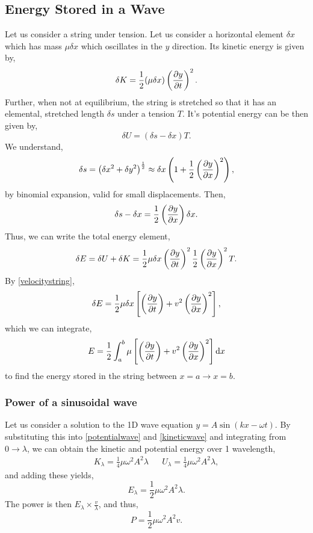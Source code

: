 \documentclass{book}
\begin{document}
\subsection{Energy Stored in a Wave}
Let us consider a string under tension. Let us consider a horizontal element $\delta x$ which has mass $\mu\delta x$ which oscillates in the $y$ direction. Its kinetic energy is given by,
\begin{equation}
    \delta K = \frac{1}{2}(\mu\delta x)\left(\pdv{y}{t}\right)^2. \label{kineticwave}
\end{equation}
Further, when not at equilibrium, the string is stretched so that it has an elemental, stretched length $\delta s$ under a tension $T$. It's potential energy can be then given by,
\begin{equation}
    \delta U = (\delta s - \delta x)T. \label{potentialwave}
\end{equation}
We understand,
\begin{equation}
    \delta s = \left(\delta x^2 + \delta y^2\right)^{\frac{1}{2}}\approx \delta x\left(1 + \frac{1}{2}\left(\pdv{y}{x}\right)^2\right),
\end{equation}
by binomial expansion, valid for small displacements. Then,
\begin{equation}
    \delta s - \delta x = \frac{1}{2}\left(\pdv{y}{x}\right)\delta x. 
\end{equation}
Thus, we can write the total energy element,
\begin{equation}
    \delta E = \delta U + \delta K = \frac{1}{2}\mu \delta x\left(\pdv{y}{t}\right)^2 \frac{1}{2}\left(\pdv{y}{x}\right)^2T.
\end{equation}
By \eqref{velocitystring},
\begin{equation}
    \delta E = \frac{1}{2}\mu\delta x\left[\left(\pdv{y}{t}\right)+ v^2\left(\pdv{y}{x}\right)^2\right],
\end{equation}
which we can integrate,
\begin{equation}
    E = \frac{1}{2}\int_a^b \mu\left[\left(\pdv{y}{t}\right)+ v^2\left(\pdv{y}{x}\right)^2\right]\dd{x}
\end{equation}
to find the energy stored in the string between $x=a \to x=b$.
\subsubsection{Power of a sinusoidal wave}
Let us consider a solution to the 1D wave equation $y = A\sin(kx -\omega t)$. By substituting this into \eqref{potentialwave} and \eqref{kineticwave} and integrating from $0 \to \lambda$, we can obtain the kinetic and potential energy over 1 wavelength,
\begin{align}
    K_{\lambda} = \frac{1}{4}\mu\omega^2A^2\lambda && U_{\lambda} = \frac{1}{4}\mu\omega^2A^2\lambda,
\end{align}
and adding these yields,
\begin{equation}
    E_{\lambda} = \frac{1}{2}\mu\omega^2A^2\lambda.
\end{equation}
The power is then $E_{\lambda}\times\frac{v}{\lambda}$, and thus,
\begin{equation}
    P = \frac{1}{2}\mu\omega^2A^2v.
\end{equation}
\end{document}

